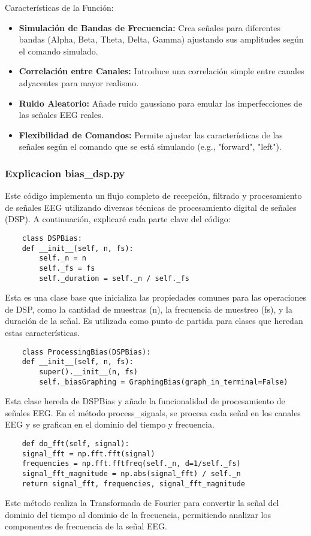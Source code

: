 \documentclass{article}
\begin{document}
Características de la Función:
\begin{itemize}
    \item \textbf{Simulación de Bandas de Frecuencia:} Crea señales para diferentes bandas (Alpha, Beta, Theta, Delta, Gamma) ajustando sus amplitudes según el comando simulado.
    \item \textbf{Correlación entre Canales:} Introduce una correlación simple entre canales adyacentes para mayor realismo.
    \item \textbf{Ruido Aleatorio:} Añade ruido gaussiano para emular las imperfecciones de las señales EEG reales.
    \item \textbf{Flexibilidad de Comandos:} Permite ajustar las características de las señales según el comando que se está simulando (e.g., "forward", "left").
\end{itemize}

\subsubsection{Explicacion bias\_dsp.py}
Este código implementa un flujo completo de recepción, filtrado y procesamiento de señales EEG utilizando diversas técnicas de procesamiento digital de señales (DSP). A continuación, explicaré cada parte clave del código:

\begin{lstlisting}
    class DSPBias:
    def __init__(self, n, fs):
        self._n = n
        self._fs = fs
        self._duration = self._n / self._fs
\end{lstlisting}
Esta es una clase base que inicializa las propiedades comunes para las operaciones de DSP, como la cantidad de muestras (n), la frecuencia de muestreo (fs), y la duración de la señal. Es utilizada como punto de partida para clases que heredan estas características.

\begin{lstlisting}
    class ProcessingBias(DSPBias):
    def __init__(self, n, fs):
        super().__init__(n, fs)
        self._biasGraphing = GraphingBias(graph_in_terminal=False)
\end{lstlisting}
Esta clase hereda de DSPBias y añade la funcionalidad de procesamiento de señales EEG. En el método process\_signals, se procesa cada señal en los canales EEG y se grafican en el dominio del tiempo y frecuencia.

\begin{lstlisting}
    def do_fft(self, signal):
    signal_fft = np.fft.fft(signal)
    frequencies = np.fft.fftfreq(self._n, d=1/self._fs)
    signal_fft_magnitude = np.abs(signal_fft) / self._n
    return signal_fft, frequencies, signal_fft_magnitude
\end{lstlisting}
Este método realiza la Transformada de Fourier para convertir la señal del dominio del tiempo al dominio de la frecuencia, permitiendo analizar los componentes de frecuencia de la señal EEG.
\end{document}

